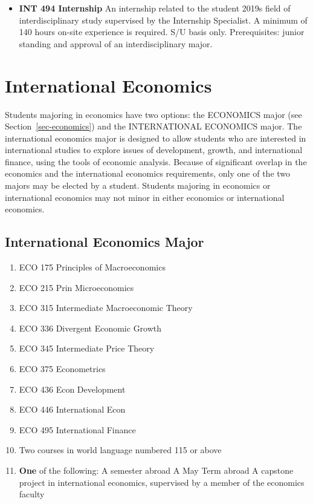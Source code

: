 \documentclass[
  letterpaper,
]{scrbook}
\providecommand{\tightlist}{%
  \setlength{\itemsep}{0pt}\setlength{\parskip}{0pt}}
\begin{document}
\begin{itemize}
\tightlist
\item
  \textbf{INT 494 Internship} An internship related to the student 2019s
  field of interdisciplinary study supervised by the Internship
  Specialist. A minimum of 140 hours on-site experience is required. S/U
  basis only. Prerequisites: junior standing and approval of an
  interdisciplinary major.
\end{itemize}

\hypertarget{sec-international-economics}{%
\section{International Economics}\label{sec-international-economics}}

Students majoring in economics have two options: the ECONOMICS major
(see Section~\ref{sec-economics}) and the INTERNATIONAL ECONOMICS major.
The international economics major is designed to allow students who are
interested in international studies to explore issues of development,
growth, and international finance, using the tools of economic analysis.
Because of significant overlap in the economics and the international
economics requirements, only one of the two majors may be elected by a
student. Students majoring in economics or international economics may
not minor in either economics or international economics.

\hypertarget{international-economics-major}{%
\subsection{International Economics
Major}\label{international-economics-major}}

\begin{enumerate}
\def\labelenumi{\arabic{enumi}.}
\tightlist
\item
  ECO 175 Principles of Macroeconomics
\item
  ECO 215 Prin Microeconomics
\item
  ECO 315 Intermediate Macroeconomic Theory
\item
  ECO 336 Divergent Economic Growth
\item
  ECO 345 Intermediate Price Theory
\item
  ECO 375 Econometrics
\item
  ECO 436 Econ Development
\item
  ECO 446 International Econ
\item
  ECO 495 International Finance
\item
  Two courses in world language numbered 115 or above
\item
  \textbf{One} of the following: A semester abroad A May Term abroad A
  capstone project in international economics, supervised by a member of
  the economics faculty
\end{enumerate}
\end{document}
